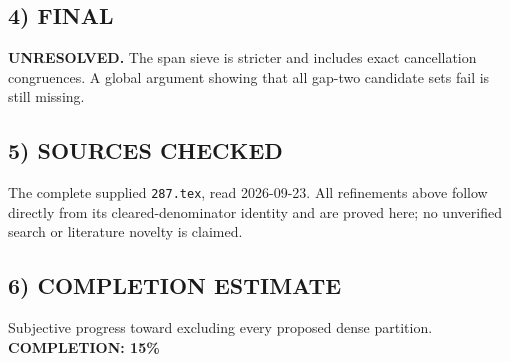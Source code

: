 \subsection*{4) FINAL}
\textbf{UNRESOLVED.} The span sieve is stricter and includes exact cancellation congruences. A global argument showing that all gap-two candidate sets fail is still missing.
\subsection*{5) SOURCES CHECKED}
The complete supplied \texttt{287.tex}, read 2026-09-23. All refinements above follow directly from its cleared-denominator identity and are proved here; no unverified search or literature novelty is claimed.
\subsection*{6) COMPLETION ESTIMATE}
Subjective progress toward excluding every proposed dense partition.
\textbf{COMPLETION: 15\%}
